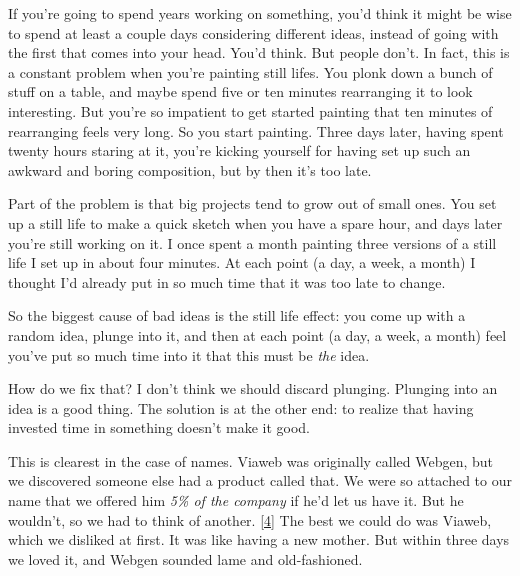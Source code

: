If
                    you're going to spend years working on something, you'd
                    think it might be wise to spend at least a couple days
                    considering different ideas, instead of going with the first
                    that comes into your head. You'd think. But people don't. In
                    fact, this is a constant problem when you're painting still
                    lifes. You plonk down a bunch of stuff on a table, and maybe
                    spend five or ten minutes rearranging it to look
                    interesting. But you're so impatient to get started painting
                    that ten minutes of rearranging feels very long. So you
                    start painting. Three days later, having spent twenty hours
                    staring at it, you're kicking yourself for having set up
                    such an awkward and boring composition, but by then it's too
                    late.

Part of the problem is that big projects
                    tend to grow out of small ones. You set up a still life to
                    make a quick sketch when you have a spare hour, and days
                    later you're still working on it. I once spent a month
                    painting three versions of a still life I set up in about
                    four minutes. At each point (a day, a week, a month) I
                    thought I'd already put in so much time that it was too late
                    to change.

So the biggest cause of bad ideas is
                    the still life effect: you come up with a random idea,
                    plunge into it, and then at each point (a day, a week, a
                    month) feel you've put so much time into it that this must
                    be \emph{the} idea.

How do we fix that? I don't
                    think we should discard plunging. Plunging into an idea is a
                    good thing. The solution is at the other end: to realize
                    that having invested time in something doesn't make it
                    good.

This is clearest in the case of names.
                    Viaweb was originally called Webgen, but we discovered
                    someone else had a product called that. We were so attached
                    to our name that we offered him \emph{5\% of the company} if
                    he'd let us have it. But he wouldn't, so we had to think of
                    another.
                    [\href{\#f4n}{4}]
                    The best we could do was Viaweb, which we disliked at first.
                    It was like having a new mother. But within three days we
                    loved it, and Webgen sounded lame and old-fashioned.

